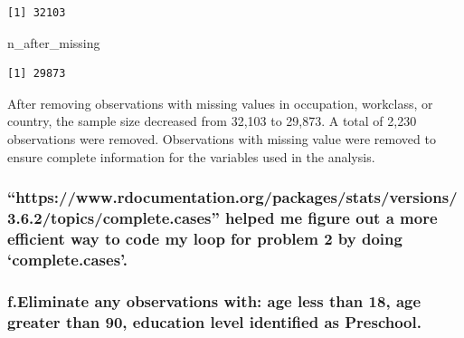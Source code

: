 \documentclass[
  letterpaper,
  DIV=11,
  numbers=noendperiod]{scrartcl}
\newenvironment{Shaded}{\begin{snugshade}}{\end{snugshade}}
\newcommand{\CommentTok}[1]{\textcolor[rgb]{0.37,0.37,0.37}{#1}}
\newcommand{\DecValTok}[1]{\textcolor[rgb]{0.68,0.00,0.00}{#1}}
\newcommand{\FunctionTok}[1]{\textcolor[rgb]{0.28,0.35,0.67}{#1}}
\newcommand{\NormalTok}[1]{\textcolor[rgb]{0.00,0.23,0.31}{#1}}
\newcommand{\OtherTok}[1]{\textcolor[rgb]{0.00,0.23,0.31}{#1}}
\newcommand{\SpecialCharTok}[1]{\textcolor[rgb]{0.37,0.37,0.37}{#1}}
\newcommand{\StringTok}[1]{\textcolor[rgb]{0.13,0.47,0.30}{#1}}
\begin{document}
\begin{verbatim}
[1] 32103
\end{verbatim}

\begin{Shaded}
\begin{Highlighting}[]
\NormalTok{n\_after\_missing}
\end{Highlighting}
\end{Shaded}

\begin{verbatim}
[1] 29873
\end{verbatim}

After removing observations with missing values in occupation,
workclass, or country, the sample size decreased from 32,103 to 29,873.
A total of 2,230 observations were removed. Observations with missing
value were removed to ensure complete information for the variables used
in the analysis.

\subsubsection{``https://www.rdocumentation.org/packages/stats/versions/3.6.2/topics/complete.cases''
helped me figure out a more efficient way to code my loop for problem 2
by doing
`complete.cases'.}\label{httpswww.rdocumentation.orgpackagesstatsversions3.6.2topicscomplete.cases-helped-me-figure-out-a-more-efficient-way-to-code-my-loop-for-problem-2-by-doing-complete.cases.}

\subsubsection{f.Eliminate any observations with: age less than 18, age
greater than 90, education level identified as
Preschool.}\label{f.eliminate-any-observations-with-age-less-than-18-age-greater-than-90-education-level-identified-as-preschool.}

\begin{Shaded}
\end{Shaded}
\end{document}
